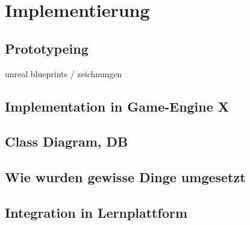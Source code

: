 \section{Implementierung}\label{sec:impl}
\subsection{Prototypeing}
	unreal blueprints / zeichnungen
\subsection{Implementation in Game-Engine X}
\subsection{Class Diagram, DB}
\subsection{Wie wurden gewisse Dinge umgesetzt}
\subsection{Integration in Lernplattform}
